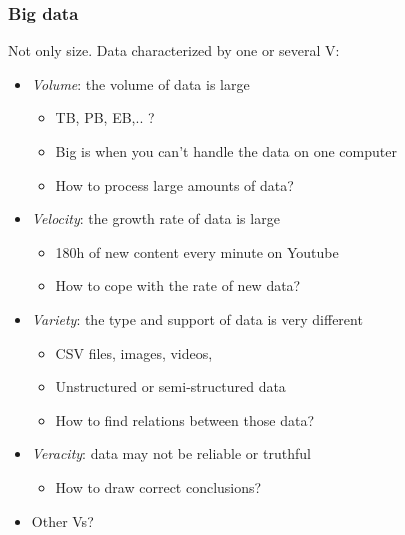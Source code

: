 \begin{frame}
  \frametitle{Big data}

  \begin{block}{Not only size.}
    Data characterized by one or several V:
    \begin{itemize}
    \item<2-> \emph{Volume}: the volume of data is large
      \begin{itemize}
      \item TB, PB, EB,.. ?
      \item Big is when you can't handle the data on one computer
      \item How to process large amounts of data?
      \end{itemize}
    \item<3-> \emph{Velocity}: the growth rate of data is large
      \begin{itemize}
      \item 180h of new content every minute on Youtube
      \item How to cope with the rate of new data?
      \end{itemize}
    \item<4-> \emph{Variety}: the type and support of data is very different
      \begin{itemize}
      \item CSV files, images, videos, \etc{}
      \item Unstructured or semi-structured data
      \item How to find relations between those data?
      \end{itemize}
    \item<5-> \emph{Veracity}: data may not be reliable or truthful
      \begin{itemize}
      \item How to draw correct conclusions?
      \end{itemize}
    \item<6-> Other Vs?
    \end{itemize}
  \end{block}
\end{frame}


